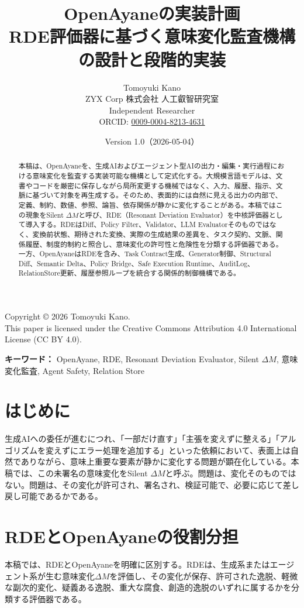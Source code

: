 \documentclass[11pt,a4paper]{article}
\title{OpenAyaneの実装計画\\\large RDE評価器に基づく意味変化監査機構の設計と段階的実装}
\author{Tomoyuki Kano\\ZYX Corp 株式会社 人工叡智研究室\\Independent Researcher\\ORCID: \href{https://orcid.org/0009-0004-8213-4631}{0009-0004-8213-4631}}
\date{Version 1.0（2026-05-04）}
\begin{document}
\maketitle

\begin{center}
Copyright \copyright{} 2026 Tomoyuki Kano.\\
This paper is licensed under the Creative Commons Attribution 4.0 International License (CC BY 4.0).
\end{center}

\begin{abstract}
本稿は、OpenAyaneを、生成AIおよびエージェント型AIの出力・編集・実行過程における意味変化を監査する実装可能な機構として定式化する。大規模言語モデルは、文書やコードを厳密に保存しながら局所変更する機械ではなく、入力、履歴、指示、文脈に基づいて対象を再生成する。そのため、表面的には自然に見える出力の内部で、定義、制約、数値、参照、論旨、依存関係が静かに変化することがある。本稿ではこの現象をSilent $\Delta M$と呼び、RDE（Resonant Deviation Evaluator）を中核評価器として導入する。RDEはDiff、Policy Filter、Validator、LLM Evaluatorそのものではなく、変換前状態、期待された変換、実際の生成結果の差異を、タスク契約、文脈、関係履歴、制度的制約と照合し、意味変化の許可性と危険性を分類する評価器である。一方、OpenAyaneはRDEを含み、Task Contract生成、Generator制御、Structural Diff、Semantic Delta、Policy Bridge、Safe Execution Runtime、AuditLog、RelationStore更新、履歴参照ループを統合する関係的制御機構である。
\end{abstract}

\noindent\textbf{キーワード：} OpenAyane, RDE, Resonant Deviation Evaluator, Silent $\Delta M$, 意味変化監査, Agent Safety, Relation Store

\section{はじめに}
生成AIへの委任が進むにつれ、「一部だけ直す」「主張を変えずに整える」「アルゴリズムを変えずにエラー処理を追加する」といった依頼において、表面上は自然でありながら、意味上重要な要素が静かに変化する問題が顕在化している。本稿では、この未署名の意味変化をSilent $\Delta M$と呼ぶ。問題は、変化そのものではない。問題は、その変化が許可され、署名され、検証可能で、必要に応じて差し戻し可能であるかである。

\section{RDEとOpenAyaneの役割分担}
本稿では、RDEとOpenAyaneを明確に区別する。RDEは、生成系またはエージェント系が生む意味変化$\Delta M$を評価し、その変化が保存、許可された逸脱、軽微な副次的変化、疑義ある逸脱、重大な腐食、創造的逸脱のいずれに属するかを分類する評価器である。
\end{document}
